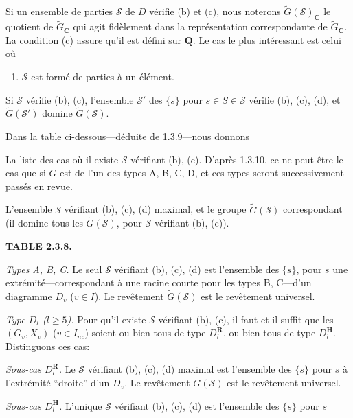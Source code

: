 \documentclass[10pt,a4paper]{article}
\providecommand{\tightlist}{\setlength{\itemsep}{0pt}\setlength{\parskip}{0pt}}
\begin{document}
Si un ensemble de parties \(\mathscr S\) de \(D\) vérifie (b) et (c), nous noterons \(\widetilde G(\mathscr S)_{\mathbf C}\) le quotient de \(\widetilde G_{\mathbf C}\) qui agit fidèlement dans la représentation correspondante de \(\widetilde G_{\mathbf C}\). La condition (c) assure qu'il est défini sur \(\mathbf Q\). Le cas le plus intéressant est celui où

\begin{enumerate}
\def\labelenumi{(\alph{enumi})}
\setcounter{enumi}{3}
\tightlist
\item
  \(\mathscr S\) est formé de parties à un élément.
\end{enumerate}

Si \(\mathscr S\) vérifie (b), (c), l'ensemble \(\mathscr S'\) des \(\{s\}\) pour \(s\in S\in\mathscr S\) vérifie (b), (c), (d), et \(\widetilde G(\mathscr S')\) domine \(\widetilde G(\mathscr S)\).

Dans la table ci-dessous---déduite de 1.3.9---nous donnons

La liste des cas où il existe \(\mathscr S\) vérifiant (b), (c). D'après 1.3.10, ce ne peut être le cas que si \(G\) est de l'un des types A, B, C, D, et ces types seront successivement passés en revue.

L'ensemble \(\mathscr S\) vérifiant (b), (c), (d) maximal, et le groupe \(\widetilde G(\mathscr S)\) correspondant (il domine tous les \(\widetilde G(\mathscr S)\), pour \(\mathscr S\) vérifiant (b), (c)).

\textbf{TABLE 2.3.8.}

\emph{Types A, B, C.} Le seul \(\mathscr S\) vérifiant (b), (c), (d) est l'ensemble des \(\{s\}\), pour \(s\) une extrémité---correspondant à une racine courte pour les types B, C---d'un diagramme \(D_v\) (\(v\in I\)). Le revêtement \(\widetilde G(\mathscr S)\) est le revêtement universel.

\emph{Type \(D_l\) (\(l\ge5\)).} Pour qu'il existe \(\mathscr S\) vérifiant (b), (c), il faut et il suffit que les \((G_v,X_v)\) (\(v\in I_{nc}\)) soient ou bien tous de type \(D_l^{\mathbf R}\), ou bien tous de type \(D_l^{\mathbf H}\). Distinguons ces cas:

\emph{Sous-cas \(D_l^{\mathbf R}\).} Le \(\mathscr S\) vérifiant (b), (c), (d) maximal est l'ensemble des \(\{s\}\) pour \(s\) à l'extrémité ``droite'' d'un \(D_v\). Le revêtement \(\widetilde G(\mathscr S)\) est le revêtement universel.

\emph{Sous-cas \(D_l^{\mathbf H}\).} L'unique \(\mathscr S\) vérifiant (b), (c), (d) est l'ensemble des \(\{s\}\) pour \(s\)
\end{document}
